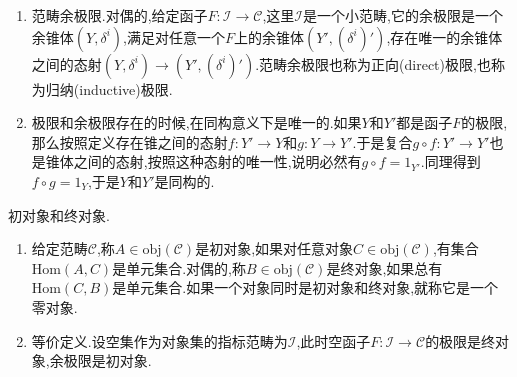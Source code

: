 \begin{enumerate}
	\item 范畴余极限.对偶的,给定函子$F:\mathscr{I}\to\mathscr{C}$,这里$\mathscr{I}$是一个小范畴,它的余极限是一个余锥体$(Y,\delta^i)$,满足对任意一个$F$上的余锥体$(Y',(\delta^i)')$,存在唯一的余锥体之间的态射$(Y,\delta^i)\to(Y',(\delta^i)')$.范畴余极限也称为正向(direct)极限,也称为归纳(inductive)极限.
	\item 极限和余极限存在的时候,在同构意义下是唯一的.如果$Y$和$Y'$都是函子$F$的极限,那么按照定义存在锥之间的态射$f:Y'\to Y$和$g:Y\to Y'$.于是复合$g\circ f:Y'\to Y'$也是锥体之间的态射,按照这种态射的唯一性,说明必然有$g\circ f=1_{Y'}$.同理得到$f\circ g=1_Y$,于是$Y$和$Y'$是同构的.
\end{enumerate}

初对象和终对象.
\begin{enumerate}
	\item 给定范畴$\mathscr{C}$,称$A\in\mathrm{obj}(\mathscr{C})$是初对象,如果对任意对象$C\in\mathrm{obj}(\mathscr{C})$,有集合$\mathrm{Hom}(A,C)$是单元集合.对偶的,称$B\in\mathrm{obj}(\mathscr{C})$是终对象,如果总有$\mathrm{Hom}(C,B)$是单元集合.如果一个对象同时是初对象和终对象,就称它是一个零对象.
	\item 等价定义.设空集作为对象集的指标范畴为$\mathscr{I}$,此时空函子$F:\mathscr{I}\to\mathscr{C}$的极限是终对象,余极限是初对象.
\end{enumerate}

